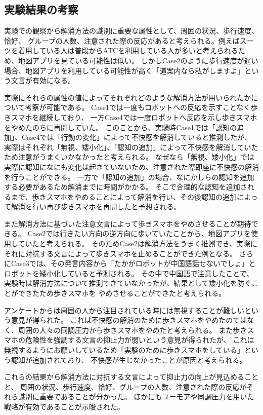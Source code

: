 \documentclass{kuisthesis}
\begin{document}
\subsection{実験結果の考察}
実験での観察から解消方法の識別に重要な属性として、周囲の状況、歩行速度、恰好、
グループの人数、注意された際の反応があると考えられる。例えばスーツを着用している人は普段からATCを利用している人が多いと考えられるため、地図アプリを見ている可能性は低い。
しかしCase2のように歩行速度が遅い場合、地図アプリを利用している可能性が高く「道案内なら私がしますよ」という文言が有効になる。

実際にそれらの属性の値によってそれぞれどのような解消方法が用いられたかについて考察が可能である。
Case1では一度もロボットへの反応を示すことなく歩きスマホを継続しており、
一方Case4では一度ロボットへ反応を示し歩きスマホをやめたのちに再開していた。
このことから、実験時Case1では「認知の追加」、Case4では「行動の変化」によって不快感を解消していると推測したが、
実際はそれぞれ「無視、矮小化」、「認知の追加」によって不快感を解消していたため注意がうまくいかなかったと考えられる。
なぜなら「無視、矮小化」では実際に認知になにも変化は起きていないため、注意された際即座に不快感の解消を行うことができる。
一方で「認知の追加」の場合、なにかしらの認知を追加する必要があるため解消までに時間がかかる。
そこで合理的な認知を追加されるまで、歩きスマホをやめることによって解消を行い、その後認知の追加によって解消を行い再び歩きスマホを再開したと予想される。

また解消方法に基づいた注意文言によって歩きスマホをやめさせることが期待できる。
Case2では行きたい方向の逆方向に歩いていたことから、地図アプリを使用していたと考えられる。
そのためCase2は解消方法をうまく推測でき、実際にそれに対抗する文言によって歩きスマホを止めることができた例となる。
さらにCase3では、その発言内容から「たかがロボットが中国語話せないでしょ」とロボットを矮小化していると予測される。
その中で中国語で注意したことで、実験時は解消方法について推測できていなかったが、結果として矮小化を防ぐことができたため歩きスマホを
やめさせることができたと考えられる。

アンケートからは周囲の人から注目されている時には無視することが難しいという意見が得られた。
これは不快感の解消のために歩きスマホをやめたのではなく、周囲の人々の同調圧力から歩きスマホをやめたと考えられる。
また歩きスマホの危険性を強調する文言の抑止力が弱いという意見が得られたが、
これは無視するようにお願いしているため「実験のために歩きスマホをしている」という認知が追加されており、
不快感が生じなかったことが原因と考えられる。

これらの結果から解消方法に対抗する文言によって抑止力の向上が見込めることと、
周囲の状況、歩行速度、恰好、グループの人数、注意された際の反応がそれら識別に重要であることが分かった。
ほかにもユーモアや同調圧力を用いた戦略が有効であることが示唆された。
\end{document}
